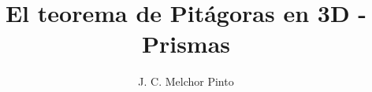 \documentclass[12pt]{guia}
\title{El teorema de Pitágoras en 3D - Prismas}
\author{J. C. Melchor Pinto}
\begin{document}
\pagestyle{headandfoot}
\addpoints
\INFO
\printanswers

\newpage
\begin{questions}
    
    
    
\end{questions}
\end{document}
